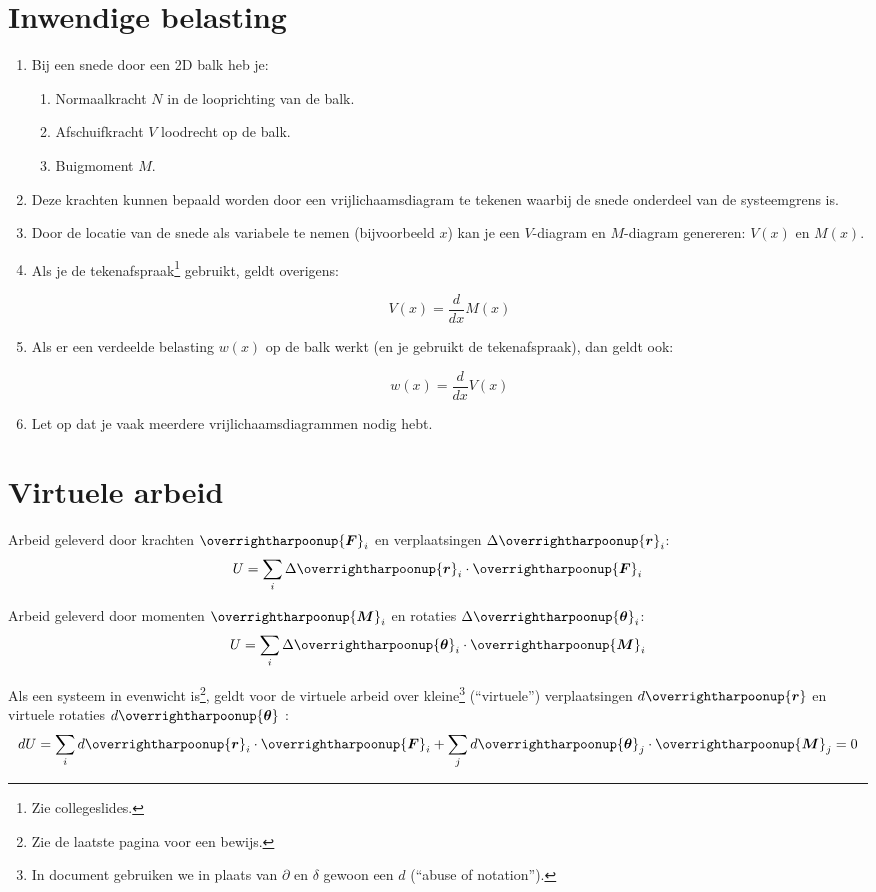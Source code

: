 \documentclass{article}
\renewcommand{\v}[1]{\overrightharpoonup{\bm{#1}}}
\newcommand{\F}{\v{F}}
\newcommand{\M}{\v{M}}
\begin{document}
\section{Inwendige belasting}
\begin{enumerate}
\item Bij een snede door een 2D balk heb je:

\begin{enumerate}
\item Normaalkracht $N$ in de looprichting van de balk.
\item Afschuifkracht $V$ loodrecht op de balk.
\item Buigmoment $M$.
\end{enumerate}

\item Deze krachten kunnen bepaald worden door een vrijlichaamsdiagram te tekenen waarbij de snede onderdeel van de systeemgrens is.

\item Door de locatie van de snede als variabele te nemen (bijvoorbeeld $x$) kan je een $V$-diagram en $M$-diagram genereren: $V(x)$ en $M(x)$. 

\item Als je de tekenafspraak\footnote{Zie collegeslides.} gebruikt, geldt overigens:

$$V(x) = \frac{d}{dx}M(x)$$

\item Als er een verdeelde belasting $w(x)$ op de balk werkt (en je gebruikt de tekenafspraak), dan geldt ook:

$$w(x) = \frac{d}{dx}V(x)$$

\item Let op dat je vaak meerdere vrijlichaamsdiagrammen nodig hebt.

\end{enumerate}

\section{Virtuele arbeid}

Arbeid geleverd door krachten $\F_i$ en verplaatsingen $\Delta\v{r}_i$:
$$U = \sum_i\Delta\v{r}_i\cdot\F_i$$

Arbeid geleverd door momenten $\M_i$ en rotaties $\Delta\v{\theta}_i$:
$$U = \sum_i\Delta\v{\theta}_i\cdot\M_i$$

Als een systeem in evenwicht is\footnote{Zie de laatste pagina voor een bewijs.}, geldt voor de virtuele arbeid over kleine\footnote{In document gebruiken we in plaats van $\partial$ en $\delta$ gewoon een $d$ (``abuse of notation'').} (``virtuele'') verplaatsingen $d\v{r}$ en virtuele rotaties $d\v{\theta}$ :
$$d U = \sum_i d\v{r}_i\cdot\F_i + \sum_j d\v{\theta}_j\cdot\v{M}_j=  0$$
\end{document}
